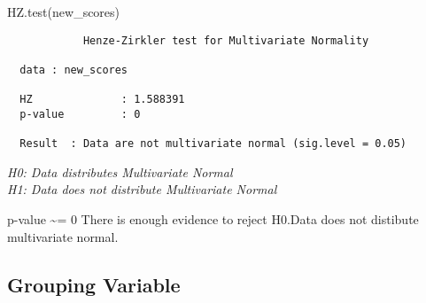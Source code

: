 \documentclass[12pt,twoside]{deuthesis}
\newenvironment{Shaded}{\begin{snugshade}}{\end{snugshade}}
\newcommand{\FunctionTok}[1]{\textcolor[rgb]{0.00,0.00,0.00}{#1}}
\newcommand{\NormalTok}[1]{#1}
\begin{document}
\begin{Shaded}
\begin{Highlighting}[]
\FunctionTok{HZ.test}\NormalTok{(new\_scores)}
\end{Highlighting}
\end{Shaded}
\begin{verbatim}
            Henze-Zirkler test for Multivariate Normality 

  data : new_scores 

  HZ              : 1.588391 
  p-value         : 0 

  Result  : Data are not multivariate normal (sig.level = 0.05) 
\end{verbatim}
\emph{H0: Data distributes Multivariate Normal}\\
\setlength{\parindent}{0in}
\emph{H1: Data does not distribute Multivariate Normal}

p-value \textasciitilde= 0 There is enough evidence to reject H0.Data does not distibute multivariate normal.

\hypertarget{grouping-variable}{%
\subsection{Grouping Variable}\label{grouping-variable}}
\end{document}
